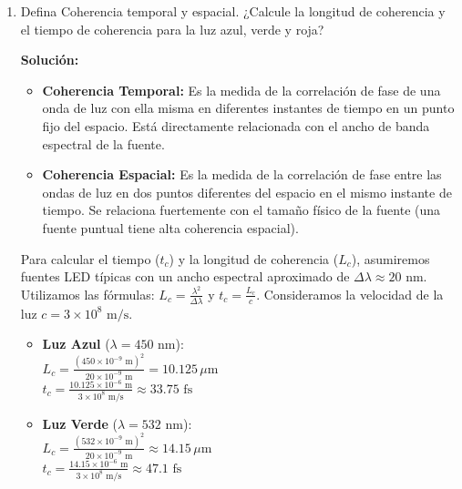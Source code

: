 \documentclass[12pt, letterpaper]{article}
\begin{document}
\begin{enumerate}
\begin{lstlisting}[language=Python]
			plt.show()
			
			return I_resta_norm, I_suma_norm
			
			# Uso: correlation_fringes('estado_base.png', 'estado_deformado.png')
		\end{lstlisting}
		
		\item Defina Coherencia temporal y espacial. ¿Calcule la longitud de coherencia y el tiempo de coherencia para la luz azul, verde y roja?
		
		\textbf{Solución:}
		\begin{itemize}
			\item \textbf{Coherencia Temporal:} Es la medida de la correlación de fase de una onda de luz con ella misma en diferentes instantes de tiempo en un punto fijo del espacio. Está directamente relacionada con el ancho de banda espectral de la fuente.
			\item \textbf{Coherencia Espacial:} Es la medida de la correlación de fase entre las ondas de luz en dos puntos diferentes del espacio en el mismo instante de tiempo. Se relaciona fuertemente con el tamaño físico de la fuente (una fuente puntual tiene alta coherencia espacial).
		\end{itemize}
		
		Para calcular el tiempo ($t_c$) y la longitud de coherencia ($L_c$), asumiremos fuentes LED típicas con un ancho espectral aproximado de $\Delta\lambda \approx 20\text{ nm}$. Utilizamos las fórmulas:
		$L_c = \frac{\lambda^2}{\Delta\lambda}$ y $t_c = \frac{L_c}{c}$. Consideramos la velocidad de la luz $c = 3 \times 10^8\text{ m/s}$.
		
		\begin{itemize}
			\item \textbf{Luz Azul} ($\lambda = 450\text{ nm}$):\\
			$L_c = \frac{(450 \times 10^{-9}\text{ m})^2}{20 \times 10^{-9}\text{ m}} = 10.125 \, \mu\text{m}$ \\
			$t_c = \frac{10.125 \times 10^{-6}\text{ m}}{3 \times 10^8\text{ m/s}} \approx 33.75\text{ fs}$
			
			\item \textbf{Luz Verde} ($\lambda = 532\text{ nm}$):\\
			$L_c = \frac{(532 \times 10^{-9}\text{ m})^2}{20 \times 10^{-9}\text{ m}} \approx 14.15 \, \mu\text{m}$ \\
			$t_c = \frac{14.15 \times 10^{-6}\text{ m}}{3 \times 10^8\text{ m/s}} \approx 47.1\text{ fs}$
			

\end{itemize}
\end{enumerate}
\end{document}

